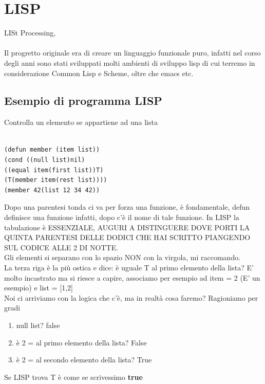 \documentclass[12pt, a4paper, openany, oneside]{book}
\begin{document}
\section{LISP}
LISt Processing, \\ \\
Il progretto originale era di creare un linguaggio funzionale puro, infatti
nel corso degli anni sono stati sviluppati molti ambienti di sviluppo lisp
di cui terremo in considerazione Common Lisp e Scheme, oltre che emacs etc.
\subsection{Esempio di programma LISP}
Controlla un elemento se appartiene ad una lista \\ \\
\begin{lstlisting}[language=LISP]
(defun member (item list)) 
(cond ((null list)nil) 
((equal item(first list))T) 
(T(member item(rest list)))) 
(member 42(list 12 34 42))
\end{lstlisting}
Dopo una parentesi tonda ci va per forza una funzione, è fondamentale, defun 
definisce una funzione infatti, dopo c'è il nome di tale funzione. In LISP la 
tabulazione è ESSENZIALE, AUGURI A DISTINGUERE DOVE PORTI LA QUINTA PARENTESI DELLE 
DODICI CHE HAI SCRITTO PIANGENDO SUL CODICE ALLE 2 DI NOTTE.
\\
Gli elementi si separano con lo spazio NON con la virgola, mi raccomando.
\\
La terza riga è la più ostica e dice: è uguale T al primo elemento della lista?
E' molto incastrato ma si riesce a capire, associamo per esempio ad item = 2
(E' un esempio) e list = [1,2] \\
Noi ci arriviamo con la logica che c'è, ma in realtà cosa faremo? Ragioniamo 
per gradi
\begin{enumerate}
	\item null list? \color{magenta} false \color{black}
	\item è 2 = al primo elemento della lista? \color{magenta} False \color{black}
	\item è 2 = al secondo elemento della lista? \color{blue}True \color{black}
\end{enumerate}
Se LISP trova T è come se scrivessimo  \color{blue}\textbf{true}\color{black}
\end{document}
